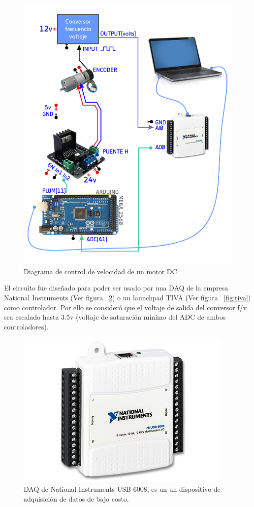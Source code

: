 \begin{figure}[h!]
  \centering
  \includegraphics[scale=0.7]{images/activities/motor_pololu/esquema-control-motor.png}
  \caption{Diagrama de control de velocidad de un motor DC}
  \label{fig:esquema-control-motor}
\end{figure}

El circuito fue diseñado para poder ser usado por una DAQ de la empresa National Instruments (Ver figura ~\ref{fig:daq}) o un launchpad TIVA (Ver figura ~\ref{fig:tiva}) como controlador. Por ello se consideró que el voltaje de salida del conversor f/v sea escalado hasta 3.5v (voltaje de saturación mínimo del ADC de ambos controladores).

\begin{figure}[h!]
  \centering
  \includegraphics[scale=0.6]{images/activities/daq/daq.jpg}
  \caption{DAQ de National Instruments USB-6008, es un un dispositivo de adquisición de datos de bajo costo.}
  \label{fig:daq}
\end{figure}

